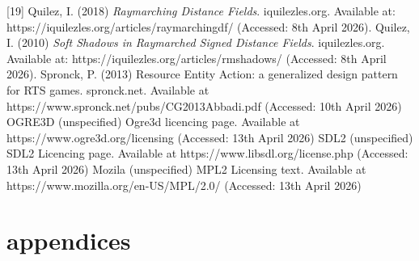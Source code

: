 \documentclass[]{final_report}
\begin{document}
[19] Quilez, I. (2018) \textit{Raymarching Distance Fields}. iquilezles.org. Available at: https://iquilezles.org/articles/raymarchingdf/ (Accessed: 8th April 2026). \newline
[20] Quilez, I. (2010) \textit{Soft Shadows in Raymarched Signed Distance Fields}. iquilezles.org. Available at: https://iquilezles.org/articles/rmshadows/ (Accessed: 8th April 2026). \newline
[21] Spronck, P. (2013) Resource Entity Action: a generalized design pattern for RTS games. spronck.net. Available at https://www.spronck.net/pubs/CG2013Abbadi.pdf (Accessed: 10th April 2026) \newline
[22] OGRE3D (unspecified) Ogre3d licencing page. Available at https://www.ogre3d.org/licensing (Accessed: 13th April 2026) \newline
[23] SDL2 (unspecified) SDL2 Licencing page. Available at https://www.libsdl.org/license.php (Accessed: 13th April 2026) \newline
[24] Mozila (unspecified) MPL2 Licensing text. Available at https://www.mozilla.org/en-US/MPL/2.0/ (Accessed: 13th April 2026) \newline 
\newpage
\chapter{appendices}
\end{document}
